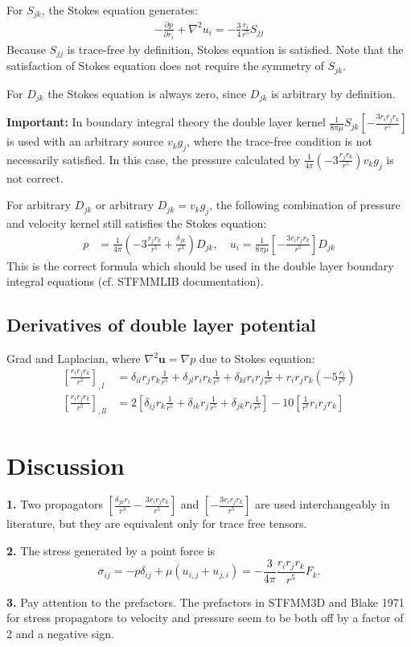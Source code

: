 \documentclass[11pt]{article}
\newcommand{\dpone}[2]{\ensuremath{\displaystyle\frac{\partial {#1}}{\partial {#2}}}}
\newcommand{\bu}{\ensuremath{\bm{u}}}
\begin{document}
For $S_{jk}$, the Stokes equation generates:
\begin{align}
	-\dpone{p}{r_i} + \nabla^2 u_i = -\frac{3}{4}\frac{r_i}{r^5} S_{jj}
\end{align}
Because $S_{jj}$ is trace-free by definition, Stokes equation is satisfied. Note that the satisfaction of Stokes equation does not require the symmetry of $S_{jk}$.

For $D_{jk}$ the Stokes equation is always zero, since $D_{jk}$ is arbitrary by definition.

\textbf{Important: }In boundary integral theory the double layer kernel $\frac{1}{8\pi\mu}S_{jk}\left[ - \frac{3r_ir_jr_k}{r^5} \right]$ is used with an arbitrary source $v_kg_j$, where the trace-free condition is not necessarily satisfied. In this case, the pressure calculated by $\frac{1}{4\pi}\left(-3\frac{r_jr_k}{r^5}\right)v_kg_j$ is not correct.

For arbitrary $D_{jk}$ or arbitrary $D_{jk}=v_kg_j$, the following combination of pressure and velocity kernel still satisfies the Stokes equation:
\begin{align}
		p& =\frac{1}{4\pi}\left(-3\frac{r_jr_k}{r^5} + \frac{\delta_{jk}}{r^3}\right)D_{jk}, \quad u_i = \frac{1}{8\pi\mu}\left[ - \frac{3r_ir_jr_k}{r^5} \right] D_{jk}
\end{align}
This is the correct formula which should be used in the double layer boundary integral equations (cf. STFMMLIB documentation).


\subsection{Derivatives of double layer potential}
Grad and Laplacian, where $\nabla^2 \bu = \nabla p$ due to Stokes equation:
\begin{align}
	\left[\frac{r_ir_jr_k}{r^5} \right]_{,l} &= \delta_{il}r_jr_k\frac{1}{r^5} + \delta_{jl}r_ir_k\frac{1}{r^5} + \delta_{kl}r_ir_j\frac{1}{r^5} + r_ir_jr_k\left(-5\frac{r_l}{r^7}\right) \\
	\left[\frac{r_ir_jr_k}{r^5} \right]_{,ll} &= 2\left[\delta_{ij}r_k\frac{1}{r^5}+\delta_{ik}r_j\frac{1}{r^5}+\delta_{jk}r_i\frac{1}{r^5}\right]-10\left[\frac{1}{r^7}r_ir_jr_k\right]
\end{align}



\section{Discussion}
\textbf{1. } Two propagators $\left[ \frac{\delta_{jk}r_i}{r^3} - \frac{3r_ir_jr_k}{r^5} \right]$ and $\left[ - \frac{3r_ir_jr_k}{r^5} \right]$ are used interchangeably in literature, but they are equivalent only for trace free tensors.

\textbf{2.} The stress generated by a point force is 
$$\sigma_{ij} = -p\delta_{ij} + \mu \left(u_{i,j}+u_{j,i}\right) = -\frac{3}{4\pi}\frac{r_ir_jr_k}{r^5}F_k. $$ 

\textbf{3. } Pay attention to the prefactors. The prefactors in STFMM3D and Blake 1971 for stress propagators to velocity and pressure seem to be both off by a factor of 2 and a negative sign.
\end{document}
